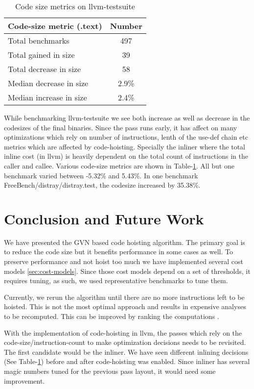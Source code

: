 \documentclass{sig-alternate}
\begin{document}
\begin{table}[h!]
  \begin{center}
    \begin{tabular}{|l|c|}
      \hline
      Code-size metric  (.text)                   & Number   \\\hline
      Total  benchmarks                           & 497      \\\hline
      Total  gained in size                       & 39       \\\hline
      Total  decrease in size                     & 58       \\\hline
      Median decrease in size                     & 2.9\%    \\\hline
      Median increase in size                     & 2.4\%    \\\hline
    \end{tabular}
  \end{center}
  \caption{Code size metrics on llvm-testsuite}
  \label{tab:code-size}
\end{table}

While benchmarking llvm-testsuite we see both increase as well as decrease in
the codesizes of the final binaries. Since the pass runs early, it has affect on
many optimizations which rely on number of instructions, lenth of the use-def
chain etc metrics which are affected by code-hoisting. Specially the inliner
where the total inline cost (in llvm) is heavily dependent on the total count of
instructions in the caller and callee. Various code-size metrics are shown in
Table-\ref{tab:code-size}. All but one benchmark varied between -5.32\% and
5.43\%.  In one benchmark FreeBench/distray/distray.test, the codesize increased
by 35.38\%.

\section{Conclusion and Future Work}
\label{sec:future-work}
We have presented the GVN based code hoisting algorithm. The primary goal is to
reduce the code size but it benefits performance in some cases as well. To
preserve performance and not hoist too much we have implemented several cost
models \ref{sec:cost-models}. Since those cost models depend on a set of thresholds,
it requires tuning, as such, we used representative benchmarks to tune them.

Currently, we rerun the algorithm until there are no more instructions left to
be hoisted. This is not the most optimal approach and results in expensive
analyses to be recomputed. This can be improved by ranking the computations
\cite{rosen1988global}.

With the implementation of code-hoisting in llvm, the passes which rely on the
code-size/instruction-count to make optimization decisions needs to be
revisited. The first candidate would be the inliner. We have seen different
inlining decisions (See Table-\ref{tab:code-size}) before and after
code-hoisting was enabled.  Since inliner has several magic numbers tuned for
the previous pass layout, it would need some improvement.



{\small

}
\end{document}
